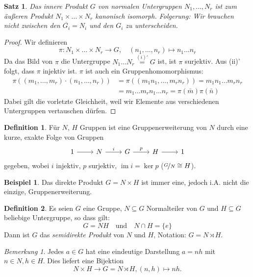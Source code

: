 \documentclass[12pt]{scrartcl} %
\DeclareMathOperator{\im}{im}
\newtheorem{thm}{Satz}
\theoremstyle{definition}
\newtheorem*{defn}{Definition}
\newtheorem{ex}{Beispiel}
\theoremstyle{remark}
\newtheorem*{nb}{Bemerkung}
\begin{document}
\begin{thm}
	Das innere Produkt $G$ von normalen Untergruppen $N_1,\dots,N_r$ ist zum äußeren Produkt $N_1\times\dots \times N_r$ kanonisch isomorph.
	Folgerung: Wir brauchen nicht zwischen den $\overline{G_i}=N_i$ und den $G_i$ zu unterscheiden.
\end{thm}

\begin{proof}
	Wir definieren $$\pi: N_1\times\dots\times N_r \longrightarrow G,\quad (n_1,\dots,n_r)\mapsto n_1\dots n_r$$
	Da das Bild von $\pi$ die Untergruppe $N_1\dots N_r \overset{(i)'}{=} G$ ist, ist $\pi$ surjektiv.
	Aus (ii)' folgt, dass $\pi$ injektiv ist.
	$\pi$ ist auch ein Gruppenhomomorphismus:
	\begin{align*}
		\pi((m_1,\dots,m_r)\cdot (n_1,\dots,n_r)) &= \pi((m_1n_1,\dots,m_rn_r)) = m_1n_1\dots m_rn_r\\
		&= m_1\dots m_rn_1\dots n_r = \pi(\bar m)\pi(\bar n)
	\end{align*}
	Dabei gilt die vorletzte Gleichheit, weil wir Elemente aus verschiedenen Untergruppen vertauschen dürfen.
\end{proof}

\begin{defn}
	Für \(N\), \(H\) Gruppen ist eine Gruppenerweiterung von $N$ durch eine kurze, exakte Folge von Gruppen
	\[ \begin{tikzcd}
		1 \arrow[r] & N \arrow[r, "i"] & G \arrow[r, "p"] & H \arrow[r] & 1
	\end{tikzcd} \]
	gegeben, wobei $i$ injektiv, $p$ surjektiv, $\im i = \ker p$ ($\nicefrac{G}{N} \cong H$).
\end{defn}

\begin{ex}
	Das direkte Produkt $G=N\times H$ ist immer eine, jedoch i.A. nicht die einzige, Gruppenerweiterung.
\end{ex}

\begin{defn}
	Es seien $G$ eine Gruppe, $N\subseteq G$ Normalteiler von $G$ und $H\subseteq G$ beliebige Untergruppe, so dass gilt:
	$$G=NH \quad \text{und} \quad N\cap H = \{e\}$$
	Dann ist $G$ das \emph{semidirekte Produkt} von $N$ und $H$, Notation: $G=N\rtimes H$.
\end{defn}

\begin{nb}
	Jedes $a\in G$ hat eine eindeutige Darstellung $a=nh$ mit $n\in N, h\in H$.
	Dies liefert eine Bijektion $$N\times H \to G=N\rtimes H, (n,h)\mapsto nh.$$
\end{nb}
\end{document}
